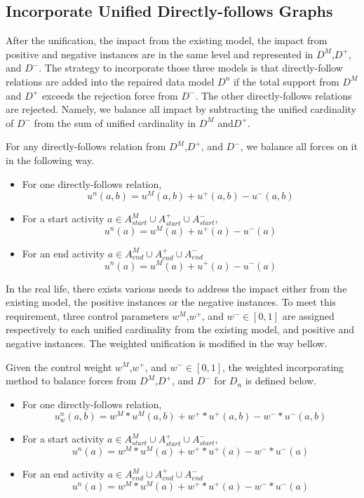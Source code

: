 \subsection{Incorporate Unified Directly-follows Graphs}
After the unification, the impact from the existing model, the impact from positive and negative instances are in the same level and represented in $D^M$,$D^+$, and $D^-$. 
The strategy to incorporate those three models is that directly-follow relations are added into the repaired data model $D^n$ if the total support from $D^M$ and $D^+$ exceeds the rejection force from $D^-$. The other directly-follows relations are rejected. Namely, we balance all impact by subtracting the unified cardinality of $D^-$ from the sum of unified cardinality in $D^M$ and$D^+$.
\begin{definition} For any directly-follows relation from $D^M$,$D^+$, and $D^-$, we balance all forces on it in the following way. 
	\begin{itemize}
		\item For one directly-follows relation, \[ u^{n}(a,b) =  u^{M}(a,b)+ u^{+}(a,b)  - u^{-}(a,b) \] 
		\item For a start activity $a \in A^{M}_{start} \cup A^{+}_{start} \cup A^{-}_{start}$,
		\[ u^{n}(a) =  u^{M}(a)+ u^{+}(a)  - u^{-}(a)\]
		\item For an end activity $a \in A^{M}_{end} \cup A^{+}_{end} \cup A^{-}_{end}$
		\[ u^{n}(a) =  u^{M}(a)+ u^{+}(a)  - u^{-}(a)  \]
	\end{itemize}	
\end{definition}
In the real life, there exists various needs to address the impact either from the existing model, the positive instances or the negative instances. To meet this requirement, three control parameters $w^{M}$,$w^{+}$, and $w^{-} \in [0,1]$ are assigned respectively to each unified cardinality from the existing model, and positive and negative instances. The weighted unification is modified in the way bellow. 
\begin{definition}
Given the control weight $w^{M}$,$w^{+}$, and $w^{-} \in [0,1]$, the weighted incorporating method to balance forces from $D^M$,$D^+$, and $D^-$ for $D_{n}$ is defined below.
\begin{itemize}
	\item For one directly-follows relation, \[ u^{n}_{w}(a,b) =  w^{M} * u^{M}(a,b)+ w^{+} * u^{+}(a,b)  - w^{-} * u^{-}(a,b) \] 
	\item For a start activity $a \in A^{M}_{start} \cup A^{+}_{start} \cup A^{-}_{start}$,
	\[ u^{n}(a) =  w^{M} * u^{M}(a)+ w^{+} * u^{+}(a)  - w^{-} * u^{-}(a)\]
	\item For an end activity $a \in A^{M}_{end} \cup A^{+}_{end} \cup A^{-}_{end}$
	\[ u^{n}(a) =  w^{M} * u^{M}(a)+ w^{+} * u^{+}(a)  - w^{-} * u^{-}(a)  \]
\end{itemize}	
\end{definition}
